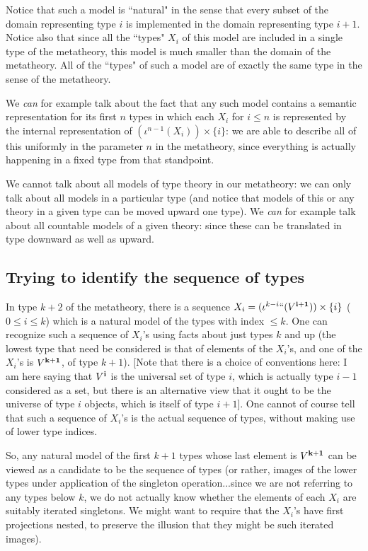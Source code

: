 \documentclass[12pt]{article}
\begin{document}
Notice that such a model is ``natural" in the sense that every subset of the domain representing type $i$ is implemented in the domain representing type $i+1$.  Notice also that since all the ``types" $X_i$ of this model are included in a single type of the metatheory, this model is much smaller than the domain of the metatheory.  All of the ``types" of such a model are of exactly the same type in the sense of the metatheory.

We {\em can\/} for example talk about the fact that any such model contains a semantic representation for its first $n$ types in which each $X_i$ for $i \leq n$ is represented by
the internal representation of $(\iota^{n-1}(X_i)) \times \{i\}$:  we are able to describe all of this uniformly in the parameter $n$ in the metatheory, since everything is actually happening in a fixed type from that standpoint.

We cannot talk about all models of type theory in our metatheory:  we can only talk about all models in a particular type (and notice that models of this or any theory in
a given type can be moved upward one type).  We {\em can\/} for example talk about all countable models of a given theory:  since these can be translated in type downward as well as upward.

\subsection{Trying to identify the sequence of types}

In type $k+2$ of the metatheory, there is a sequence $X_i = (\iota^{k-i}``(V^{\bf i+1})) \times \{i\}$ ($0 \leq i \leq k$) which is a natural model of the types with index $\leq k$.  One can recognize such a sequence of $X_i$'s using facts about just types $k$ and up (the lowest type that need be considered is that of elements of the $X_i$'s, and one of the $X_i$'s is $V^{\bf k+1}$, of type $k+1$).  [Note that there is a choice of conventions here:  I am here saying that $V^{\bf i}$ is the universal set of type $i$, which is actually type $i-1$  considered as a set, but there is an alternative view that it ought to be the universe of type $i$ objects, which is itself of type $i+1$].  One cannot of course tell that such a sequence of $X_i$'s is the actual sequence of types, without making use of lower type indices.

So, any natural model of the first $k+1$ types whose last element is $V^{\bf k+1}$ can be viewed as a candidate to be the sequence of types (or rather, images of the lower types under application of the singleton operation...since we are not referring to any types below $k$, we do not actually know whether the elements of each $X_i$ are suitably iterated singletons.  We might want to require that the $X_i$'s have first projections nested, to preserve the illusion that they might be such iterated images).
\end{document}

